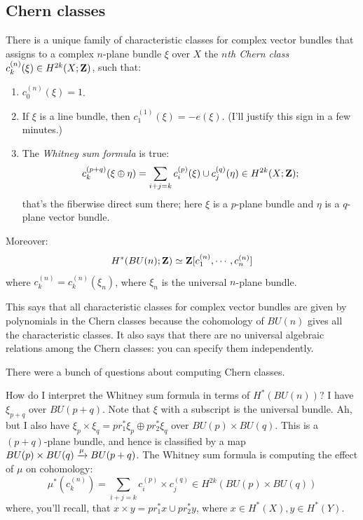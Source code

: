 \subsection{Chern classes}
\begin{theorem}
    There is a unique family of characteristic classes for complex vector bundles that assigns to a complex $n$-plane bundle $\xi$ over $X$ the \emph{$n$th Chern class} $c^{(n)}_k(\xi)\in H^{2k}(X;\mathbf Z)$, such that:
    \begin{enumerate}
	\item $c^{(n)}_0(\xi) = 1$.
	\item If $\xi$ is a line bundle, then $c^{(1)}_1(\xi) = -e(\xi)$. (I'll justify this sign in a few minutes.)
	\item The \emph{Whitney sum formula} is true:
	    \begin{equation*}
		c^{(p+q)}_k(\xi\oplus \eta) = \sum_{i+j=k} c^{(p)}_i(\xi)\cup c^{(q)}_j(\eta) \in H^{2k}(X;\mathbf Z);
	    \end{equation*}
	    that's the fiberwise direct sum there; here $\xi$ is a $p$-plane bundle and $\eta$ is a $q$-plane vector bundle.
    \end{enumerate}
    Moreover:
    $$H^\ast(BU(n);\mathbf Z) \simeq \mathbf Z[c_1^{(n)}, \cdots, c^{(n)}_n]$$
    where $c^{(n)}_k = c^{(n)}_k(\xi_n)$, where $\xi_n$ is the universal $n$-plane bundle.
\end{theorem}
This says that all characteristic classes for complex vector bundles are given by polynomials in the Chern classes
because the cohomology of $BU(n)$ gives all the characteristic classes.
It also says that there are no universal algebraic relations among the Chern classes: you can specify them independently.

There were a bunch of questions about computing Chern classes.

How do I interpret the Whitney sum formula in terms of $H^\ast(BU(n))$?
I have $\xi_{p+q}$ over $BU(p+q)$.
Note that $\xi$ with a subscript is the universal bundle.
Ah, but I also have $\xi_p\times \xi_q = pr_1^\ast \xi_p\oplus pr_2^\ast\xi_q$ over $BU(p)\times BU(q)$.
This is a $(p+q)$-plane bundle, and hence is classified by a map $BU(p)\times BU(q) \xrightarrow{{\mu}} BU(p+q)$.
The Whitney sum formula is computing the effect of $\mu$ on cohomology:
$$
\mu^\ast(c^{(n)}_k) = \sum_{i+j = k} c^{(p)}_i \times c^{(q)}_j \in H^{2k}(BU(p)\times BU(q))
$$
where, you'll recall, that $x\times y = pr_1^\ast x \cup pr_2^\ast y$, where $x\in H^\ast(X),y\in H^\ast(Y)$.


